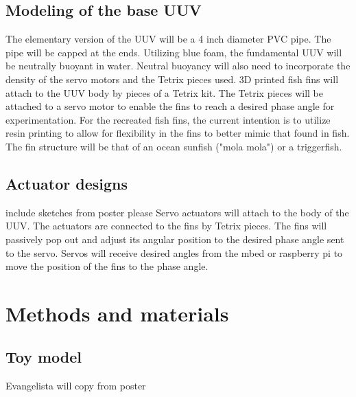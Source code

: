 \documentclass[twocolumn,10pt]{IEEEtran}
\begin{document}
\subsection{Modeling of the base UUV}
The elementary version of the UUV will be a 4 inch diameter PVC pipe.  The pipe will be capped at the ends.  Utilizing blue foam, the fundamental UUV will be neutrally buoyant in water.  Neutral buoyancy will also need to incorporate the density of the servo motors and the Tetrix pieces used.  3D printed fish fins will attach to the UUV body by pieces of a Tetrix kit.  The Tetrix pieces will be attached to a servo motor to enable the fins to reach a desired phase angle for experimentation.  For the recreated fish fins, the current intention is to utilize resin printing to allow for flexibility in the fins to better mimic that found in fish.  The fin structure will be that of an ocean sunfish ("mola mola") or a triggerfish. 
 
\subsection{Actuator designs}
include sketches from poster please
Servo actuators will attach to the body of the UUV.  The actuators are connected to the fins by Tetrix pieces.  The fins will passively pop out and adjust its angular position to the desired phase angle sent to the servo.  Servos will receive desired angles from the mbed or raspberry pi to move the position of the fins to the phase angle.  

\section{Methods and materials}
\subsection{Toy model}
Evangelista will copy from poster
\end{document}
